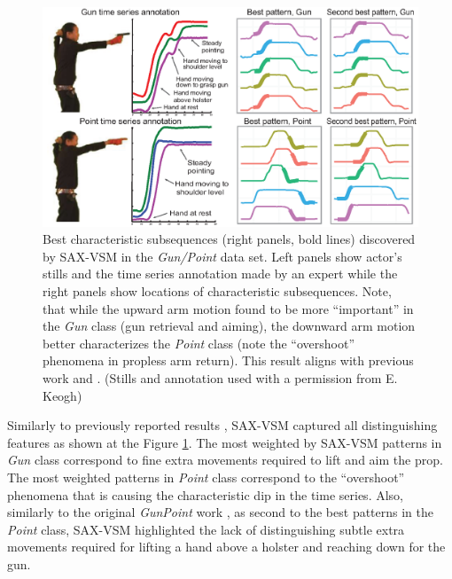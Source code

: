 \begin{figure}[t]
   \centering
   \includegraphics[width=130mm]{figures/gun-point.eps}
   \caption{Best characteristic subsequences (right panels, bold lines) discovered by SAX-VSM in
   the \textit{Gun/Point} data set. 
   Left panels show actor's stills and the time series annotation made by an expert while the right panels 
   show locations of characteristic subsequences.
   Note, that while the upward arm motion found to be more ``important'' in the \textit{Gun} class 
   (gun retrieval and aiming), the downward arm motion better characterizes the \textit{Point} class 
   (note the ``overshoot'' phenomena in propless arm return). 
   This result aligns with previous work \cite{citeulike:7344347} and \cite{citeulike:11345338}.
   (Stills and annotation used with a permission from E. Keogh) }
   \label{fig:shapelet-like-patterns}
\end{figure}

Similarly to previously reported results \cite{citeulike:7344347} \cite{citeulike:11345338}, 
SAX-VSM captured all distinguishing features as shown at the Figure \ref{fig:shapelet-like-patterns}. 
The most weighted by SAX-VSM patterns in \textit{Gun} class correspond to fine extra movements required to 
lift and aim the prop. 
The most weighted patterns in \textit{Point} class correspond to the ``overshoot'' phenomena that is causing the 
characteristic dip in the time series. 
Also, similarly to the original \textit{GunPoint} work \cite{Ratanamahatana04makingtime-series}, as second to the best 
patterns in the \textit{Point} class, SAX-VSM highlighted the lack of distinguishing subtle extra movements required
for lifting a hand above a holster and reaching down for the gun.

